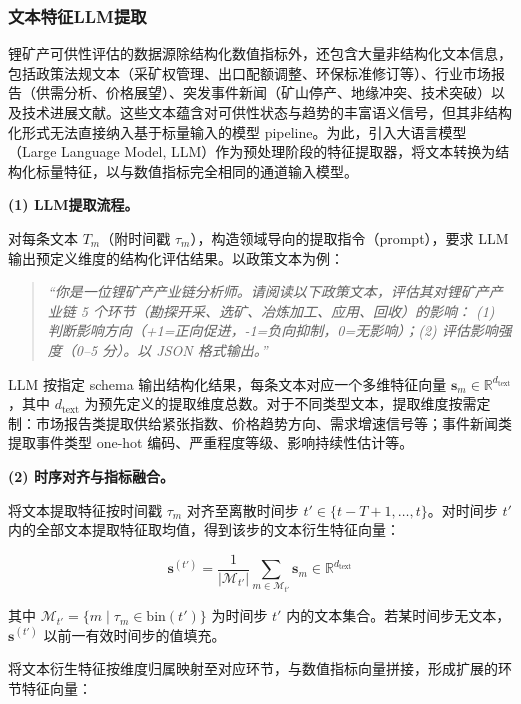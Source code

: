 \subsubsection{文本特征LLM提取}
\label{sec:text_llm}

锂矿产可供性评估的数据源除结构化数值指标外，还包含大量非结构化文本信息，包括政策法规文本（采矿权管理、出口配额调整、环保标准修订等）、行业市场报告（供需分析、价格展望）、突发事件新闻（矿山停产、地缘冲突、技术突破）以及技术进展文献。这些文本蕴含对可供性状态与趋势的丰富语义信号，但其非结构化形式无法直接纳入基于标量输入的模型 pipeline。为此，引入大语言模型（Large Language Model, LLM）作为预处理阶段的特征提取器，将文本转换为结构化标量特征，以与数值指标完全相同的通道输入模型。

\textbf{(1) LLM提取流程。}

对每条文本 $T_m$（附时间戳 $\tau_m$），构造领域导向的提取指令（prompt），要求 LLM 输出预定义维度的结构化评估结果。以政策文本为例：

\begin{quote}
\textit{``你是一位锂矿产产业链分析师。请阅读以下政策文本，评估其对锂矿产产业链 5 个环节（勘探开采、选矿、冶炼加工、应用、回收）的影响： (1) 判断影响方向（+1=正向促进，-1=负向抑制，0=无影响）；(2) 评估影响强度（0--5 分）。以 JSON 格式输出。''}
\end{quote}

LLM 按指定 schema 输出结构化结果，每条文本对应一个多维特征向量 $\mathbf{s}_m \in \mathbb{R}^{d_{\text{text}}}$，其中 $d_{\text{text}}$ 为预先定义的提取维度总数。对于不同类型文本，提取维度按需定制：市场报告类提取供给紧张指数、价格趋势方向、需求增速信号等；事件新闻类提取事件类型 one-hot 编码、严重程度等级、影响持续性估计等。

\textbf{(2) 时序对齐与指标融合。}

将文本提取特征按时间戳 $\tau_m$ 对齐至离散时间步 $t' \in \{t-T+1,\ldots,t\}$。对时间步 $t'$ 内的全部文本提取特征取均值，得到该步的文本衍生特征向量：

\begin{equation}
\mathbf{s}^{(t')} = \frac{1}{|\mathcal{M}_{t'}|} \sum_{m \in \mathcal{M}_{t'}} \mathbf{s}_m \in \mathbb{R}^{d_{\text{text}}}
\end{equation}

其中 $\mathcal{M}_{t'} = \{m \mid \tau_m \in \text{bin}(t')\}$ 为时间步 $t'$ 内的文本集合。若某时间步无文本，$\mathbf{s}^{(t')}$ 以前一有效时间步的值填充。

将文本衍生特征按维度归属映射至对应环节，与数值指标向量拼接，形成扩展的环节特征向量：

